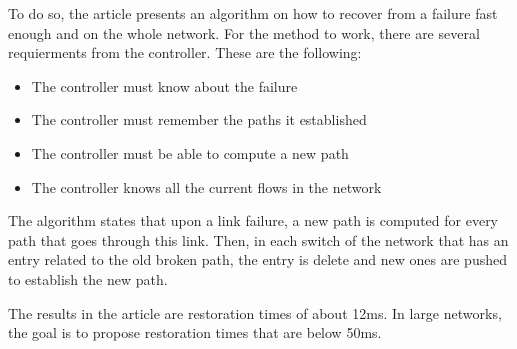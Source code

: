 \documentclass[11pt,a4paper]{article}
\begin{document}
To do so, the article presents an algorithm on how to recover from a failure fast enough and on the whole network.
For the method to work, there are several requierments from the controller. These are the following:
\begin{itemize}
	\item The controller must know about the failure
	\item The controller must remember the paths it established
	\item The controller must be able to compute a new path
	\item The controller knows all the current flows in the network
\end{itemize}
The algorithm states that upon a link failure, a new path is computed for every path that goes through this link.
Then, in each switch of the network that has an entry related to the old broken path, the entry is delete and new ones are pushed to establish the new path.

The results in the article are restoration times of about 12ms. In large networks, the goal is to propose restoration times that are below 50ms. 
\end{document}
